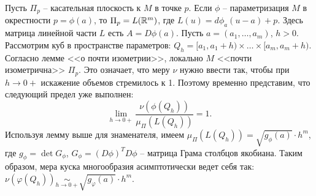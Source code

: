 \begin{example}
	Пусть $\Pi_p$ -- касательная плоскость к $M$ в точке $p$. 
	Если $\phi$ -- параметризация $M$ в окрестности $p = \phi(a)$, то $\Pi_p = L(\mathbb{R}^m)$, где $L(u) = d\phi_a (u-a) + p$. 
	Здесь матрица линейной части $L$ есть $A = D \phi(a)$.
	Пусть $a = (a_1, \dotsc, a_m)$, $h > 0$. Рассмотрим куб в пространстве параметров: $Q_h = [a_1, a_1 + h) \times \dotsc \times [a_m, a_m + h)$. 
	Согласно лемме <<о почти изометрии>>, локально $M$ <<почти изометрична>> $\Pi_p$. Это означает, что меру $\nu$ нужно ввести так, чтобы при $h \to 0+$ искажение объемов стремилось к 1. 
	Поэтому временно представим, что следующий предел уже выполнен:
	\[ \lim \limits_{h \to 0+} \frac{\nu(\phi(Q_h))}{\mu_{\Pi}(L(Q_h))} = 1. \]
	Используя лемму выше для знаменателя, имеем $\mu_{\Pi}(L(Q_h)) = \sqrt{g_{\phi}(a)} \cdot h^m$, где
	$g_{\phi} = \det G_{\phi}$, $G_{\phi} = (D \phi)^T D \phi$ -- матрица Грама столбцов якобиана.
	Таким образом, мера куска многообразия асимптотически ведет себя так: $\nu(\varphi(Q_h)) \underset{h \to 0+}{\sim} \sqrt{g_{\varphi}(a)} \cdot h^m$.
\end{example}